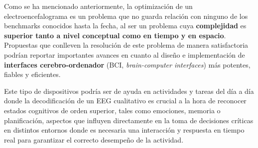 Como se ha mencionado anteriormente, la optimización de un electroencefalograma es un problema que no guarda relación con ninguno de los benchmarks conocidos hasta la fecha, al ser un problema cuya \textbf{complejidad} es \textbf{superior tanto a nivel conceptual como en tiempo y en espacio}. Propuestas que conlleven la resolución de este problema de manera satisfactoria podrían reportar importantes avances en cuanto al diseño e implementación de \textbf{interfaces cerebro-ordenador} (BCI, \textit{brain-computer interfaces}) \cite{BCI} más potentes, fiables y eficientes.

Este tipo de dispositivos podría ser de ayuda en actividades y tareas del día a día donde la decodificación de un EEG cualitativo es crucial a la hora de reconocer estados cognitivos de orden superior, tales como emociones, memoria o planificación, aspectos que influyen directamente en la toma de decisiones críticas\cite{EvolutionaryBigOpt} en distintos entornos donde es necesaria una interacción y respuesta en tiempo real para garantizar el correcto desempeño de la actividad.






